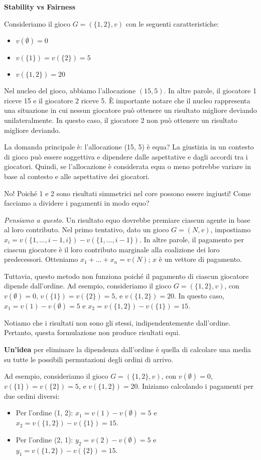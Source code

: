 \textbf{Stability vs Fairness}

Consideriamo il gioco $G = (\{1, 2\}, v)$ con le seguenti caratteristiche:
\begin{itemize}
    \item $v(\emptyset) = 0$
    \item $v(\{1\}) = v(\{2\}) = 5$
    \item $v(\{1, 2\}) = 20$
\end{itemize}

Nel nucleo del gioco, abbiamo l'allocazione $(15, 5)$. In altre parole, il
giocatore 1 riceve 15 e il giocatore 2 riceve 5. È importante notare che il
nucleo rappresenta una situazione in cui nessun giocatore può ottenere un
risultato migliore deviando unilateralmente. In questo caso, il giocatore 2 non
può ottenere un risultato migliore deviando.

La domanda principale è: l'allocazione (15, 5) è equa? La giustizia in un
contesto di gioco può essere soggettiva e dipendere dalle aspettative e dagli
accordi tra i giocatori. Quindi, se l'allocazione è considerata equa o meno
potrebbe variare in base al contesto e alle aspettative dei giocatori.

No! Poiché 1 e 2 sono risultati simmetrici nel core possono essere ingiusti!
Come facciamo a dividere i pagamenti in modo equo?

\textit{Pensiamo a questo.} Un risultato equo dovrebbe premiare ciascun agente in base al loro contributo.
Nel primo tentativo, dato un gioco $G = (N, v)$, impostiamo $x_i = v(\{1,
    \ldots, i-1, i\}) - v(\{1, \ldots, i-1\})$. In altre parole, il pagamento per
ciascun giocatore è il loro contributo marginale alla coalizione dei loro
predecessori. Otteniamo $x_1 + \ldots + x_n = v(N)$; $x$ è un vettore di
pagamento.

Tuttavia, questo metodo non funziona poiché il pagamento di ciascun giocatore
dipende dall'ordine. Ad esempio, consideriamo il gioco $G = (\{1, 2\}, v)$, con
$v(\emptyset) = 0$, $v(\{1\}) = v(\{2\}) = 5$, e $v(\{1, 2\}) = 20$. In questo
caso, $x_1 = v(1) - v(\emptyset) = 5$ e $x_2 = v(\{1, 2\}) - v(\{1\}) = 15$.

Notiamo che i risultati non sono gli stessi, indipendentemente dall'ordine.
Pertanto, questa formulazione non produce risultati equi.

\textbf{Un'idea} per eliminare la dipendenza dall'ordine è quella di calcolare una media su tutte le possibili permutazioni degli ordini di arrivo.

Ad esempio, consideriamo il gioco $G = (\{1, 2\}, v)$, con $v(\emptyset) = 0$,
$v(\{1\}) = v(\{2\}) = 5$, e $v(\{1, 2\}) = 20$. Iniziamo calcolando i
pagamenti per due ordini diversi:
\begin{itemize}
    \item Per l'ordine (1, 2): $x_1 = v(1) - v(\emptyset) = 5$ e $x_2 = v(\{1, 2\}) -
              v(\{1\}) = 15$.
    \item Per l'ordine (2, 1): $y_2 = v(2) - v(\emptyset) = 5$ e $y_1 = v(\{1, 2\}) -
              v(\{2\}) = 15$.
\end{itemize}

